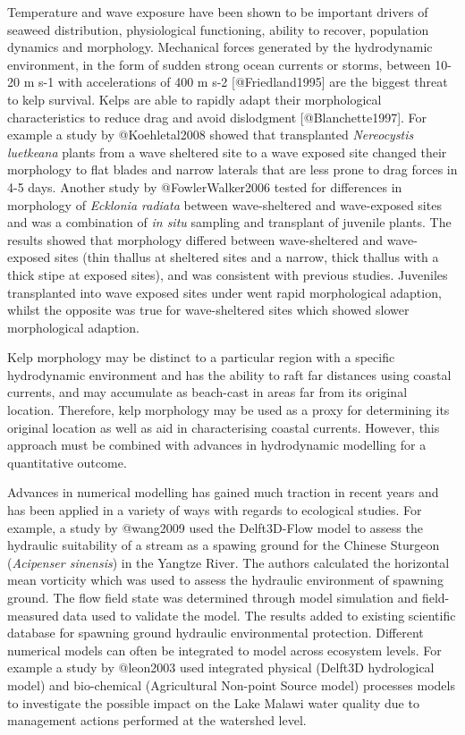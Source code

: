 \documentclass[]{article}
\begin{document}
Temperature and wave exposure have been shown to be important drivers of
seaweed distribution, physiological functioning, ability to recover,
population dynamics and morphology. Mechanical forces generated by the
hydrodynamic environment, in the form of sudden strong ocean currents or
storms, between 10- 20 m s-1 with accelerations of 400 m s-2
{[}@Friedland1995{]} are the biggest threat to kelp survival. Kelps are
able to rapidly adapt their morphological characteristics to reduce drag
and avoid dislodgment {[}@Blanchette1997{]}. For example a study by
@Koehletal2008 showed that transplanted \emph{Nereocystis luetkeana}
plants from a wave sheltered site to a wave exposed site changed their
morphology to flat blades and narrow laterals that are less prone to
drag forces in 4-5 days. Another study by @FowlerWalker2006 tested for
differences in morphology of \emph{Ecklonia radiata} between
wave-sheltered and wave-exposed sites and was a combination of \emph{in
situ} sampling and transplant of juvenile plants. The results showed
that morphology differed between wave-sheltered and wave-exposed sites
(thin thallus at sheltered sites and a narrow, thick thallus with a
thick stipe at exposed sites), and was consistent with previous studies.
Juveniles transplanted into wave exposed sites under went rapid
morphological adaption, whilst the opposite was true for wave-sheltered
sites which showed slower morphological adaption.

Kelp morphology may be distinct to a particular region with a specific
hydrodynamic environment and has the ability to raft far distances using
coastal currents, and may accumulate as beach-cast in areas far from its
original location. Therefore, kelp morphology may be used as a proxy for
determining its original location as well as aid in characterising
coastal currents. However, this approach must be combined with advances
in hydrodynamic modelling for a quantitative outcome.

Advances in numerical modelling has gained much traction in recent years
and has been applied in a variety of ways with regards to ecological
studies. For example, a study by @wang2009 used the Delft3D-Flow model
to assess the hydraulic suitability of a stream as a spawing ground for
the Chinese Sturgeon (\emph{Acipenser sinensis}) in the Yangtze River.
The authors calculated the horizontal mean vorticity which was used to
assess the hydraulic environment of spawning ground. The flow field
state was determined through model simulation and field-measured data
used to validate the model. The results added to existing scientific
database for spawning ground hydraulic environmental protection.
Different numerical models can often be integrated to model across
ecosystem levels. For example a study by @leon2003 used integrated
physical (Delft3D hydrological model) and bio-chemical (Agricultural
Non-point Source model) processes models to investigate the possible
impact on the Lake Malawi water quality due to management actions
performed at the watershed level.
\end{document}
